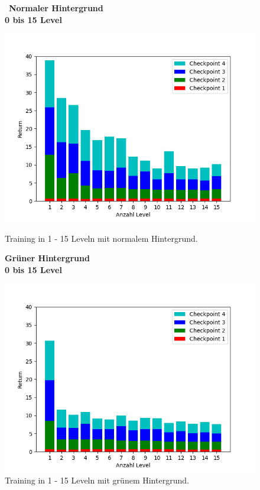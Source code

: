\begin{figure}[htp!]
   \centering
   \captionsetup{width=0.45\linewidth} 
    \begin{minipage}{0.48\linewidth}
        \centering\
        \textbf{Normaler Hintergrund\\0 bis 15 Level}\par\medskip
        \includegraphics[scale=0.5]{abb/_graphen/serie_auswendig_floor}
        \caption{Training in 1 - 15 Leveln mit normalem Hintergrund.}
        \label{fig:grph_floor_80Mio_200lvl_15act_Training_evalAsTraining_1to15}
    \end{minipage}
    \centering
    \begin{minipage}{0.48\linewidth}
        \centering
        \textbf{Grüner Hintergrund\\0 bis 15 Level}\par\medskip
        \includegraphics[scale=0.5]{abb/_graphen/serie_auswendig_green} 
        \caption{Training in 1 - 15 Leveln mit grünem Hintergrund.}
        \label{fig:grph_green_80Mio_inflvl_15act_Training_evalAsTraining_1to15}
    \end{minipage}
\end{figure}

